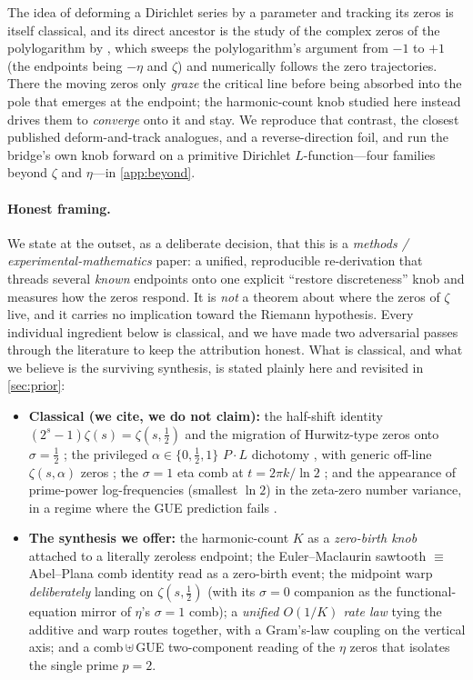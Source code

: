 \documentclass[11pt]{article}
\theoremstyle{definition}
\begin{document}
The idea of deforming a Dirichlet series by a parameter and tracking its zeros is
itself classical, and its direct ancestor is the study of the complex zeros of the
polylogarithm by \citet{FornbergKolbig1975}, which sweeps the polylogarithm's
argument from $-1$ to $+1$ (the endpoints being $-\eta$ and $\zeta$) and numerically
follows the zero trajectories. There the moving zeros only \emph{graze} the critical
line before being absorbed into the pole that emerges at the endpoint; the
harmonic-count knob studied here instead drives them to \emph{converge} onto it and
stay. We reproduce that contrast, the closest published deform-and-track analogues,
and a reverse-direction foil, and run the bridge's own knob forward on a primitive
Dirichlet $L$-function---four families beyond $\zeta$ and $\eta$---in
\cref{app:beyond}.

\paragraph{Honest framing.}
We state at the outset, as a deliberate decision, that this is a \emph{methods /
experimental-mathematics} paper: a unified, reproducible re-derivation that
threads several \emph{known} endpoints onto one explicit ``restore discreteness''
knob and measures how the zeros respond. It is \emph{not} a theorem about where
the zeros of $\zeta$ live, and it carries no implication toward the Riemann
hypothesis. Every individual ingredient below is classical, and we have made two
adversarial passes through the literature to keep the attribution honest. What is
classical, and what we believe is the surviving synthesis, is stated plainly here
and revisited in \cref{sec:prior}:

\begin{itemize}[leftmargin=1.4em]
\item \textbf{Classical (we cite, we do not claim):} the half-shift identity
  $(2^s-1)\zeta(s)=\zeta(s,\tfrac12)$ and the migration of Hurwitz-type zeros
  onto $\sigma=\tfrac12$ \citep{Gonek1981,GarunkstisSteuding2007}; the privileged
  $\alpha\in\{0,\tfrac12,1\}$ $P\cdot L$ dichotomy
  \citep{SaiasWeingartner2009}, with generic off-line $\zeta(s,\alpha)$ zeros
  \citep{DavenportHeilbronn1936,Cassels1961}; the $\sigma=1$ eta comb at
  $t=2\pi k/\ln 2$ \citep{Sondow2003,BeliakovMatiyasevich2015}; and the
  appearance of prime-power log-frequencies (smallest $\ln 2$) in the
  zeta-zero number variance, in a regime where the GUE prediction fails
  \citep{Berry1988,LugarMilinovichQuesadaHerrera2022}.
\item \textbf{The synthesis we offer:} the harmonic-count $K$ as a
  \emph{zero-birth knob} attached to a literally zeroless endpoint; the
  Euler--Maclaurin sawtooth $\equiv$ Abel--Plana comb identity read as a
  zero-birth event; the midpoint warp \emph{deliberately} landing on
  $\zeta(s,\tfrac12)$ (with its $\sigma=0$ companion as the functional-equation
  mirror of $\eta$'s $\sigma=1$ comb); a \emph{unified $O(1/K)$ rate law} tying
  the additive and warp routes together, with a Gram's-law coupling on the
  vertical axis; and a comb\,$\uplus$\,GUE two-component reading of the $\eta$
  zeros that isolates the single prime $p=2$.
\end{itemize}
\end{document}
